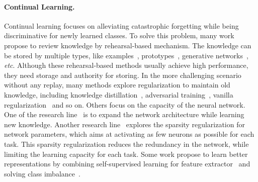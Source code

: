 \documentclass[10pt,twocolumn,letterpaper]{article}
\newcommand{\myPara}[1]{\vspace{-.08in}\paragraph{#1}}
\def\etc{\emph{etc}}
\begin{document}
\myPara{Continual Learning.}
Continual learning focuses on alleviating catastrophic forgetting
while being discriminative for newly learned classes.
To solve this problem,
many work~\cite{kim2021continual,bang2021rainbow,chaudhry2020using,smith2021always,belouadah2019il2m}
propose to review knowledge by rehearsal-based mechanism.
The knowledge can be stored by multiple types,
like examples~\cite{verwimp2021rehearsal,cha2021co2l,bang2021rainbow,shim2020online,chaudhry2020using,buzzega2020dark},
prototypes~\cite{zhu2021prototype,zhu2021self,hayes2020remind},
generative networks~\cite{maracani2021recall}, \etc.
Although these rehearsal-based methods usually achieve high performance,
they need storage and authority for storing.
In the more challenging scenario without any replay,
many methods explore regularization to maintain old knowledge,
including knowledge distillation~\cite{chaudhry2018riemannian,li2017learning,rebuffi2017icarl,simon2021learning,cheraghian2021semantic,douillard2020podnet,dhar2019learning},
adversarial training~\cite{ebrahimi2020adversarial,xiang2019incremental},
vanilla regularization~\cite{zenke2017continual,kirkpatrick2017overcoming,pan2020continual,iscen2020memory,liu2020more,tao2020topology,yu2020semantic,park2019continual} and so on.
Others focus on the capacity of the neural network.
One of the research line~\cite{Liu2020AANets,verma2021efficient,singh2021rectification,yan2021dynamically,singh2020calibrating,kanakis2020reparameterizing} is to expand the network architecture while learning new knowledge.
Another research line~\cite{jung2020continual,abati2020conditional} explores the sparsity regularization for network parameters,
which aims at activating as few neurons as possible for each task.
This sparsity regularization reduces the redundancy in the network,
while limiting the learning capacity for each task.
Some work propose to learn better representations by combining self-supervised learning for feature extractor~\cite{wu2021striking,cha2021co2l}
and solving class imbalance~\cite{zhang2021few,liu2020incremental,kim2020imbalanced,zhao2020maintaining,hou2019learning}.
\end{document}
